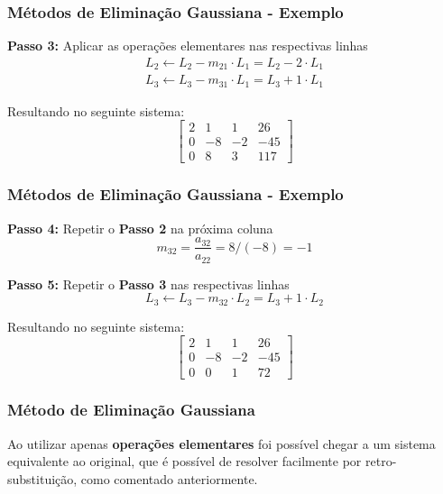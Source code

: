\documentclass{beamer}
\theoremstyle{mystyle}
\begin{document}
\begin{frame}
	\frametitle{Métodos de Eliminação Gaussiana - Exemplo}
	\textbf{Passo 3:} Aplicar as operações elementares nas respectivas linhas
	\begin{gather*}
		L_{2} \leftarrow L_{2} - m_{21}\cdot L_{1} = L_{2} - 2\cdot L_{1}\\
		L_{3} \leftarrow L_{3} - m_{31}\cdot L_{1} = L_{3} + 1\cdot L_{1}
	\end{gather*}

	Resultando no seguinte sistema:
	\begin{equation*}
		\left[
		\begin{array}{ccc|c}
			2  & 1  & 1 & 26 \\
			0  & -8 & -2 & -45  \\
			0  &  8 & 3 & 117
		\end{array}
		\right]
	\end{equation*}
\end{frame}

\begin{frame}
	\frametitle{Métodos de Eliminação Gaussiana - Exemplo}
	\textbf{Passo 4:} Repetir o \textbf{Passo 2} na próxima coluna
	\begin{equation*}
		m_{32} = \dfrac{a_{32}}{a_{22}} = 8/(-8) = -1
	\end{equation*}
	
	\textbf{Passo 5:} Repetir o \textbf{Passo 3} nas respectivas linhas
	\begin{equation*}
		L_{3} \leftarrow L_{3} - m_{32}\cdot L_{2} = L_{3} + 1\cdot L_{2}
	\end{equation*}
	
	Resultando no seguinte sistema:
	\begin{equation*}
		\left[
		\begin{array}{ccc|c}
			2  & 1  & 1 & 26 \\
			0  & -8 & -2 & -45  \\
			0  &  0 & 1 & 72
		\end{array}
		\right]
	\end{equation*}
\end{frame}

\begin{frame}
	\frametitle{Método de Eliminação Gaussiana}
	Ao utilizar apenas \textbf{operações elementares} foi possível chegar a um sistema equivalente ao original, que é possível de resolver facilmente por retro-substituição, como comentado anteriormente.
\end{frame}
\end{document}
